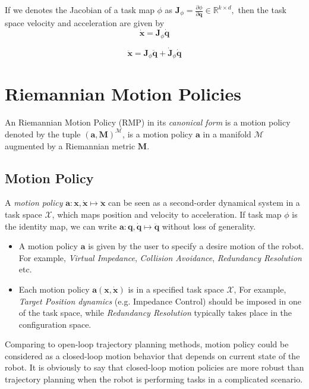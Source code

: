 If we denotes the Jacobian of a task map $\phi$ as
$\mathbf{J}_{\phi} = \frac{\partial \phi}{\partial  \mathbf{q}} \in \mathbb{R}^{k \times d},$ 
then the task space velocity and acceleration are given by
\begin{equation}
\dot{\mathbf{x}} = \mathbf{J}_{\phi}\dot{\mathbf{q}}
\end{equation}

\begin{equation}
\ddot{\mathbf{x}} = \mathbf{J}_{\phi}\ddot{\mathbf{q}} + \dot{\mathbf{J}}_{\phi}\dot{\mathbf{q}}
\end{equation}

\section{Riemannian Motion Policies}

An Riemannian Motion Policy (RMP) in its \textit{canonical form} is a motion policy denoted by the tuple $(\mathbf{a}, \mathbf{M})^{\mathcal{M}}$, is a motion policy $\mathbf{a}$ in a manifold $\mathcal{M}$ augmented by a Riemannian metric $\mathbf{M}$.

\subsection{Motion Policy}
A \textit{motion policy} $\mathbf{a} : \mathbf{x}, \dot{\mathbf{x}} \longmapsto \ddot{\mathbf{x}} $ can be seen as a second-order dynamical system in a task space $\mathcal{X}$, which maps position and velocity to acceleration. If task map $\phi$ is the identity map, we can write $\mathbf{a}:\mathbf{q},\dot{\mathbf{q}} \longmapsto \ddot{\mathbf{q}}$ without loss of generality.  

\begin{itemize}

\item A motion policy $\mathbf{a}$ is given by the user to specify a desire motion of the robot. For example, \textit{Virtual Impedance}, \textit{Collision Avoidance}, \textit{Redundancy Resolution} etc.


\item Each motion policy $\mathbf{a}(\mathbf{x}, \dot{\mathbf{x}}) $ is in a specified task space $\mathcal{X}$, For example,  \textit{Target Position dynamics} (e.g. Impedance Control) should be imposed in one of the task space, while \textit{Redundancy Resolution}  typically  takes place in the configuration space.


\end{itemize}
Comparing to open-loop trajectory planning methods, motion policy could be considered as a closed-loop motion behavior that depends on current state of the robot. It is obviously to say that closed-loop motion policies are more robust than trajectory planning when the robot is performing tasks in a complicated scenario.
